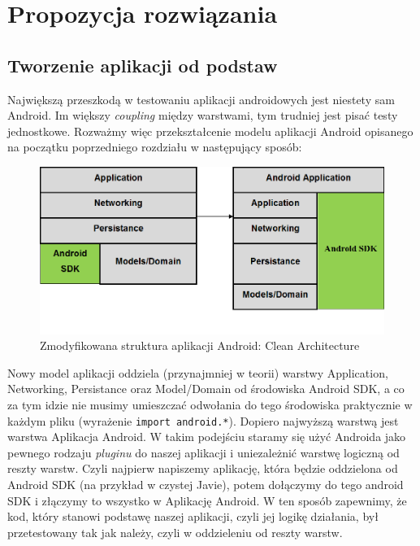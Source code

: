 \chapter{Propozycja rozwiązania}

\section{Tworzenie aplikacji od podstaw}
\label{clean_architecture}
Największą przeszkodą w testowaniu aplikacji androidowych jest niestety sam Android. Im większy \textit{coupling} między warstwami, tym trudniej jest pisać testy jednostkowe. Rozważmy więc przekształcenie modelu aplikacji Android opisanego na początku poprzedniego rozdziału w następujący sposób:

\begin{figure}[!htb]
    \centering
    \includegraphics[width=13cm]{imgs/ch4_opis_rozwiazania_1.png}
    \caption
{Zmodyfikowana struktura aplikacji Android: Clean Architecture}
    \label{fig:opis_rozwiazania}
\end{figure} 

Nowy model aplikacji oddziela (przynajmniej w teorii) warstwy Application, Networking, Persistance oraz Model/Domain od środowiska Android SDK, a co za tym idzie nie musimy umieszczać odwołania do tego środowiska praktycznie w każdym pliku (wyrażenie \texttt{import android.*}). Dopiero najwyższą warstwą jest warstwa Aplikacja Android. W takim podejściu staramy się użyć Androida jako pewnego rodzaju \textit{pluginu} do naszej aplikacji i uniezależnić warstwę logiczną od reszty warstw. Czyli najpierw napiszemy aplikację, która będzie oddzielona od Android SDK (na przykład w czystej Javie), potem dołączymy do tego android SDK i złączymy to wszystko w Aplikację Android. W ten sposób zapewnimy, że kod, który stanowi podstawę naszej aplikacji, czyli jej logikę działania, był przetestowany tak jak należy, czyli w oddzieleniu od reszty warstw.

